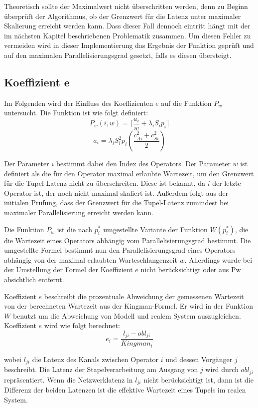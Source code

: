 Theoretisch sollte der Maximalwert nicht überschritten werden, denn zu Beginn überprüft der Algorithmus, ob der Grenzwert für die Latenz unter maximaler Skalierung erreicht werden kann.
Dass dieser Fall dennoch eintritt hängt mit der im nächsten Kapitel beschriebenen Problematik zusammen.
Um diesen Fehler zu vermeiden wird in dieser Implementierung das Ergebnis der Funktion geprüft und auf den maximalen Parallelisierungsgrad gesetzt, falls es diesen übersteigt.

\subsection{Koeffizient e}

Im Folgenden wird der Einfluss des Koeffizienten \(e\) auf die Funktion \(P_w\) untersucht.
Die Funktion ist wie folgt definiert:
\[P_w(i, w) = \lceil \frac{a_i}{w} + \lambda_i S_i p_i \rceil \]
\[a_i = \lambda_i S^{2}_{i} p_i \left(\frac{{c^{2}_{Ai}} + {c^{2}_{Si}}}{2}\right)\]

Der Parameter \(i\) bestimmt dabei den Index des Operators. 
Der Parameter \(w\) ist definiert als die für den Operator maximal erlaubte Wartezeit, um den Grenzwert für die Tupel-Latenz nicht zu überschreiten.
Diese ist bekannt, da \(i\) der letzte Operator ist, der noch nicht maximal skaliert ist.
Außerdem folgt aus der initialen Prüfung, dass der Grenzwert für die Tupel-Latenz zumindest bei maximaler Parallelisierung erreicht werden kann.

Die Funktion \(P_w\) ist die nach \(p_i^\ast\) umgestellte Variante der Funktion \(W(p_i^\ast)\), die die Wartezeit eines Operators abhängig vom Parallelisierungsgrad bestimmt. 
Die umgestellte Formel bestimmt nun den Parallelisierungsgrad eines Operators abhängig von der maximal erlaubten Warteschlangenzeit \(w\). 
Allerdings wurde bei der Umstellung der Formel der Koeffizient \(e\) nicht berücksichtigt oder aus Pw absichtlich entfernt. 

Koeffizient \(e\) beschreibt die prozentuale Abweichung der gemessenen Wartezeit von der berechneten Wartezeit aus der Kingman-Formel. 
Er wird in der Funktion \(W\) benutzt um die Abweichung von Modell und realem System auszugleichen.
Koeffizient \(e\) wird wie folgt berechnet:
\[ e_i = \frac{l_{ji} - obl_{ji}}{Kingman_i}\]

wobei \(l_{ji}\) die Latenz des Kanals zwischen Operator \(i\) und dessen Vorgänger \(j\) beschreibt.
Die Latenz der Stapelverarbeitung am Ausgang von \(j\) wird durch \(obl_{ji}\) repräsentiert.
Wenn die Netzwerklatenz in \(l_{ji}\) nicht berücksichtigt ist, dann ist die Differenz der beiden Latenzen ist die effektive Wartezeit eines Tupels im realen System.

